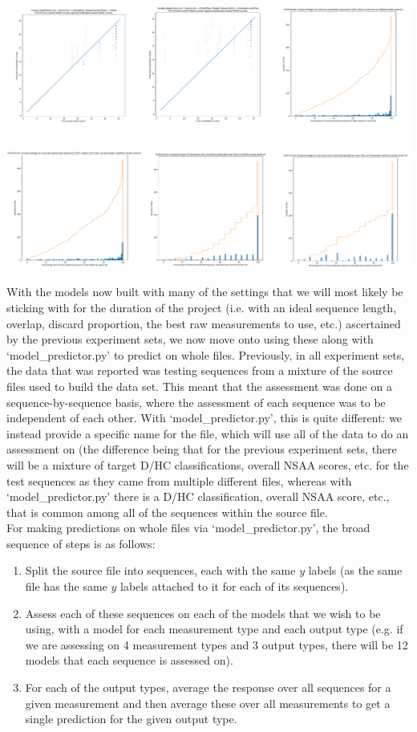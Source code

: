 \documentclass[12pt,twoside]{report}
\begin{document}
\begin{center}
\includegraphics[scale=0.5]{project_figures/fig11_2}
\end{center}

\quad With the models now built with many of the settings that we will most likely be sticking with for the duration of the project (i.e. with an ideal sequence length, overlap, discard proportion, the best raw measurements to use, etc.) ascertained by the previous experiment sets, we now move onto using these along with ‘model\_predictor.py’ to predict on whole files. Previously, in all experiment sets, the data that was reported was testing sequences from a mixture of the source files used to build the data set. This meant that the assessment was done on a sequence-by-sequence basis, where the assessment of each sequence was to be independent of each other. With ‘model\_predictor.py’, this is quite different: we instead provide a specific name for the file, which will use all of the data to do an assessment on (the difference being that for the previous experiment sets, there will be a mixture of target D/HC classifications, overall NSAA scores, etc. for the test sequences as they came from multiple different files, whereas with ‘model\_predictor.py’ there is a D/HC classification, overall NSAA score, etc., that is common among all of the sequences within the source file.\\

\quad For making predictions on whole files via ‘model\_predictor.py’, the broad sequence of steps is as follows:

\begin{enumerate}
	\item Split the source file into sequences, each with the same $y$ labels (as the same file has the same $y$ labels attached to it for each of its sequences).
	\item Assess each of these sequences on each of the models that we wish to be using, with a model for each measurement type and each output type (e.g. if we are assessing on 4 measurement types and 3 output types, there will be 12 models that each sequence is assessed on).
	\item For each of the output types, average the response over all sequences for a given measurement and then average these over all measurements to get a single prediction for the given output type.
\end{enumerate}
\end{document}
